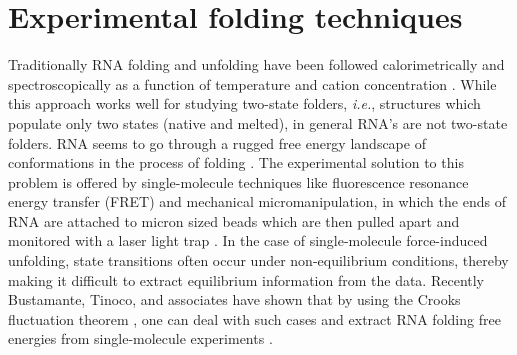 \section{Experimental folding techniques}
Traditionally   RNA   folding  and   unfolding   have  been   followed
calorimetrically  and spectroscopically as  a function  of temperature
and cation concentration  \cite{bloomfield2000, boots2008}. While this
approach  works well  for studying  two-state  folders, \textit{i.e.},
structures  which populate  only two  states (native  and  melted), in
general RNA's  are not  two-state folders. RNA  seems to go  through a
rugged  free  energy landscape  of  conformations  in  the process  of
folding \cite{zhuang2003}.  The  experimental solution to this problem
is offered  by single-molecule techniques  like fluorescence resonance
energy transfer (FRET) and  mechanical micromanipulation, in which the
ends of RNA  are attached to micron sized beads  which are then pulled
apart  and  monitored  with  a laser  light  trap  \cite{liphardt2001,
  onoa2004,  tinoco2004, hyeon2005}.  In  the case  of single-molecule
force-induced   unfolding,  state   transitions   often  occur   under
non-equilibrium  conditions, thereby  making it  difficult  to extract
equilibrium  information from the  data. Recently  Bustamante, Tinoco,
and associates have shown that by using the Crooks fluctuation theorem
\cite{crooks1999},  one  can deal  with  such  cases  and extract  RNA
folding    free     energies    from    single-molecule    experiments
\cite{collin2005}.

